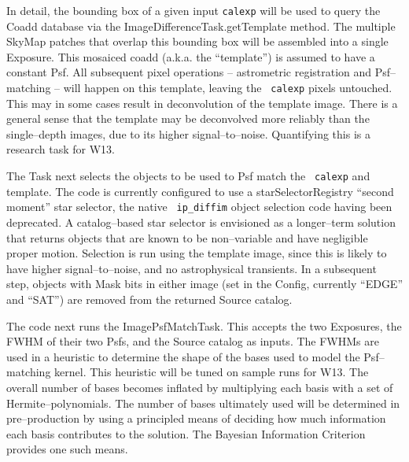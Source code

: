 \documentclass[12pt]{article}
\begin{document}
In detail, the bounding box of a given input {\tt calexp} will be used
to query the Coadd database via the ImageDifferenceTask.getTemplate
method.  The multiple SkyMap patches that overlap this bounding box
will be assembled into a single Exposure.  This mosaiced coadd
(a.k.a. the ``template'') is assumed to have a constant Psf.  All
subsequent pixel operations -- astrometric registration and
Psf--matching -- will happen on this template, leaving the {\tt
  calexp} pixels untouched.  This may in some cases result in
deconvolution of the template image.  There is a general sense that
the template may be deconvolved more reliably than the single--depth
images, due to its higher signal--to--noise.  Quantifying this is a
research task for W13.

The Task next selects the objects to be used to Psf match the {\tt
  calexp} and template.  The code is currently configured to use a
starSelectorRegistry ``second moment'' star selector, the native {\tt
  ip\_diffim} object selection code having been deprecated.  A
catalog--based star selector is envisioned as a longer--term solution
that returns objects that are known to be non--variable and have
negligible proper motion.  Selection is run using the template image,
since this is likely to have higher signal--to--noise, and no
astrophysical transients.  In a subsequent step, objects with Mask
bits in either image (set in the Config, currently ``EDGE'' and
``SAT'') are removed from the returned Source catalog.

The code next runs the ImagePsfMatchTask.  This accepts the two
Exposures, the FWHM of their two Psfs, and the Source catalog as
inputs.  The FWHMs are used in a heuristic to determine the shape of
the bases used to model the Psf--matching kernel.  This heuristic will
be tuned on sample runs for W13.  The overall number of bases becomes
inflated by multiplying each basis with a set of Hermite--polynomials.
The number of bases ultimately used will be determined in
pre--production by using a principled means of deciding how much
information each basis contributes to the solution.  The Bayesian
Information Criterion provides one such means.
\end{document}
